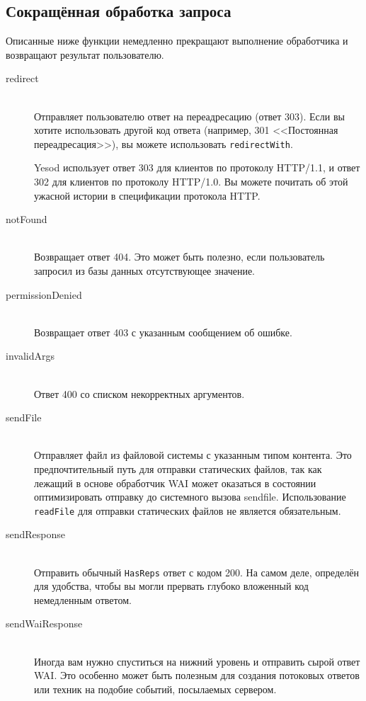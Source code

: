 \subsection{Сокращённая обработка запроса}
Описанные ниже функции немедленно прекращают выполнение обработчика и
возвращают результат пользователю.
\begin{description}
\item[redirect] \hfill \\
Отправляет пользователю ответ на переадресацию (ответ 303). Если вы
хотите использовать другой код ответа (например, 301 <<Постоянная
переадресация>>), вы можете использовать \lstinline!redirectWith!.

\begin{remark}
Yesod использует ответ 303 для клиентов по протоколу HTTP/1.1, и ответ
302 для клиентов по протоколу HTTP/1.0. Вы можете почитать об этой
ужасной истории в спецификации протокола HTTP.
\end{remark}

\item[notFound] \hfill \\
Возвращает ответ 404. Это может быть полезно, если пользователь
запросил из базы данных отсутствующее значение.

\item[permissionDenied] \hfill \\
Возвращает ответ 403 с указанным сообщением об ошибке.

\item[invalidArgs] \hfill \\
Ответ 400 со списком некорректных аргументов.

\item[sendFile] \hfill \\
Отправляет файл из файловой системы с указанным типом контента. Это
предпочтительный путь для отправки статических файлов, так как лежащий
в основе обработчик WAI может оказаться в состоянии оптимизировать
отправку до системного вызова sendfile. Использование
\lstinline!readFile! для отправки статических файлов не является
обязательным.

\item[sendResponse] \hfill \\
Отправить обычный \lstinline!HasReps! ответ с кодом 200. На самом
деле, определён для удобства, чтобы вы могли прервать глубоко
вложенный код немедленным ответом.

\item[sendWaiResponse] \hfill \\
Иногда вам нужно спуститься на нижний уровень и отправить сырой ответ
WAI. Это особенно может быть полезным для создания потоковых ответов
или техник на подобие событий, посылаемых сервером.
\end{description}


